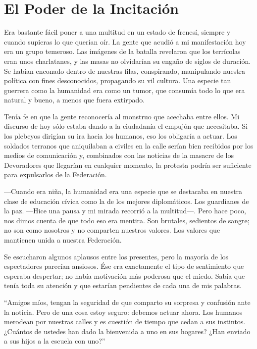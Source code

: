 \chapter{El Poder de la Incitación}\label{sec:el-poder-de-la-incitacion}

    Era bastante fácil poner a una multitud en un estado de frenesí, siempre y cuando supieras lo que querían oír. La gente que acudió a mi manifestación hoy era un grupo temeroso. Las imágenes de la batalla revelaron que los terrícolas eran unos charlatanes, y las masas no olvidarían su engaño de siglos de duración. Se habían enconado dentro de nuestras filas, conspirando, manipulando nuestra política con fines desconocidos, propagando su vil cultura. Una especie tan guerrera como la humanidad era como un tumor, que consumía todo lo que era natural y bueno, a menos que fuera extirpado.

    Tenía fe en que la gente reconocería al monstruo que acechaba entre ellos. Mi discurso de hoy sólo estaba dando a la ciudadanía el empujón que necesitaba. Si los plebeyos dirigían su ira hacia los humanos, eso los obligaría a actuar. Los soldados terranos que aniquilaban a civiles en la calle serían bien recibidos por los medios de comunicación y, combinados con las noticias de la masacre de los Devoradores que llegarían en cualquier momento, la protesta podría ser suficiente para expulsarlos de la Federación.

    —Cuando era niña, la humanidad era una especie que se destacaba en nuestra clase de educación cívica como la de los mejores diplomáticos. Los guardianes de la paz. —Hice una pausa y mi mirada recorrió a la multitud—. Pero hace poco, nos dimos cuenta de que todo eso era mentira. Son brutales, sedientos de sangre; no son como nosotros y no comparten nuestros valores. Los valores que mantienen unida a nuestra Federación.

    Se escucharon algunos aplausos entre los presentes, pero la mayoría de los espectadores parecían ansiosos. Ése era exactamente el tipo de sentimiento que esperaba despertar; no había motivación más poderosa que el miedo. Sabía que tenía toda su atención y que estarían pendientes de cada una de mis palabras.

    ``Amigos míos, tengan la seguridad de que comparto su sorpresa y confusión ante la noticia. Pero de una cosa estoy seguro: debemos actuar ahora. Los humanos merodean por nuestras calles y es cuestión de tiempo que cedan a sus instintos. ¿Cuántos de ustedes han dado la bienvenida a uno en sus hogares? ¿Han enviado a sus hijos a la escuela con uno?''


